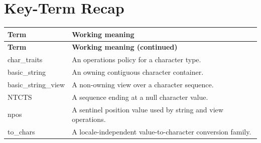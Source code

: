 \documentclass[11pt,letterpaper]{article}
\begin{document}
\section{Key-Term Recap}
\begin{longtable}{@{}>{\RaggedRight\arraybackslash}p{}>{\RaggedRight\arraybackslash}p{}@{}}\toprule\textbf{Term} & \textbf{Working meaning}\\\midrule\endfirsthead\toprule\textbf{Term} & \textbf{Working meaning (continued)}\\\midrule\endhead\bottomrule\endfoot
char\_\allowbreak{}traits & An operations policy for a character type.\\
basic\_\allowbreak{}string & An owning contiguous character container.\\
basic\_\allowbreak{}string\_\allowbreak{}view & A non-owning view over a character sequence.\\
NTCTS & A sequence ending at a null character value.\\
npos & A sentinel position value used by string and view operations.\\
to\_\allowbreak{}chars & A locale-independent value-to-character conversion family.\\
\end{longtable}
\end{document}
